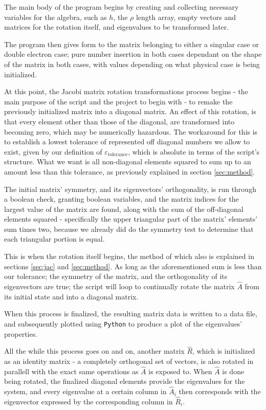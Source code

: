 \documentclass[11pt,a4paper,notitlepage]{article}
\begin{document}
The main body of the program begins by creating and collecting necessary variables for the algebra, such as $h$, the $\rho$ length array, empty vectors and matrices for the rotation itself, and eigenvalues to be transformed later.

The program then gives form to the matrix belonging to either a singular case or double electron case; pure number insertion in both cases dependant on the shape of the matrix in both cases, with values depending on what physical case is being initialized.

At this point, the Jacobi matrix rotation transformations process begins - the main purpose of the script and the project to begin with - to remake the previously initialized matrix into a diagonal matrix. An effect of this rotation, is that every element other than those of the diagonal, are transformed into becoming zero, which may be numerically hazardous. The workaround for this is to establish a lowest tolerance of represented off diagonal numbers we allow to exist, given by our definition of $\varepsilon_\text{tolerance}$, which is absolute in terms of the script's structure. What we want is all non-diagonal elements squared to sum up to an amount less than this tolerance, as previously explained in section \ref{sec:method}.

The initial matrix' symmetry, and its eigenvectors' orthogonality, is run through a boolean check, granting boolean variables, and the matrix indices for the largest value of the matrix are found, along with the sum of the off-diagonal elements squared - specifically the upper triangular part of the matrix' elements' sum times two, because we already did do the symmetry test to determine that each triangular portion is equal.

This is when the rotation itself begins, the method of which also is explained in sections \ref{sec:jac} and \ref{sec:method}. As long as the aforementioned sum is less than our tolerance; the symmetry of the matrix, and the orthogonality of its eigenvectors are true; the script will loop to continually rotate the matrix $\hat{A}$ from its initial state and into a diagonal matrix.

When this process is finalized, the resulting matrix data is written to a data file, and subsequently plotted using \verb|Python| to produce a plot of the eigenvalues' properties.


All the while this process goes on and on, another matrix $\hat{R}$, which is initialized as an identity matrix - a completely orthogonal set of vectors, is also rotated in parallell with the exact same operations as $\hat{A}$ is exposed to. When $\hat{A}$ is done being rotated, the finalized diagonal elements provide the eigenvalues for the system, and every eigenvalue at a certain column in $\hat{A}_i$ then corresponds with the eigenvector expressed by the corresponding column in $\hat{R}_i$.
\end{document}

